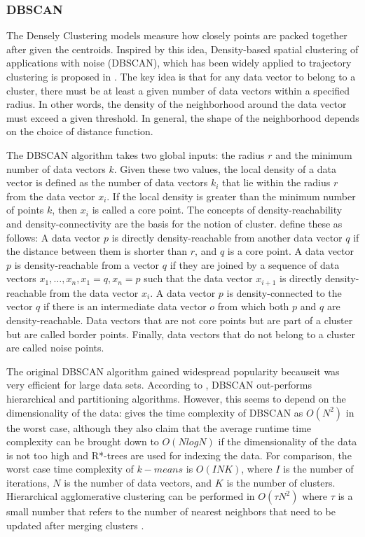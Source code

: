 \documentclass[a4paper, 12pt]{article}
\begin{document}
\subsubsection{DBSCAN}
The Densely Clustering models measure how closely points are packed together after given the centroids. Inspired by this idea, Density-based spatial clustering of applications with noise (DBSCAN), which has been widely applied to trajectory clustering is proposed in \citeyear{ester1996density}. The key idea is that for any data vector to belong to a cluster, there must be at least a given number of data vectors within a specified radius. In other words, the density of the neighborhood around the data vector must exceed a given threshold. In general, the shape of the neighborhood depends on the choice of distance function.

The DBSCAN algorithm \citep{ester1996density, kriegel2011density} takes two global inputs: the radius $r$ and the minimum number of data vectors $k$. Given these two values, the local density of a data vector is defined as the number of data vectors $k_{i}$ that lie within the radius $r$ from the data vector ${x_{i}}$. If the local density is greater than the minimum number of points $k$, then $x_{i}$ is called a core point. The concepts of density-reachability and density-connectivity are the basis for the notion of cluster. \cite{ester1996density} define these as follows: A data vector $p$ is directly density-reachable from another data vector $q$ if the distance between them is shorter than $r$, and $q$ is a core point. A data vector $p$ is density-reachable from a vector $q$ if they are joined by a sequence of data vectors $x_{1},\dots,x_{n}, x_{1}=q, x_{n}=p$ such that the data vector $x_{i+1}$ is directly density-reachable from the data vector $x_{i}$. A data vector $p$ is density-connected to the vector $q$ if there is an intermediate data vector $o$ from which both $p$ and $q$ are density-reachable. Data vectors that are not core points but are part of a cluster but are called border points. Finally, data vectors that do not belong to a cluster are called noise points.

The original DBSCAN algorithm gained widespread popularity becauseit was very efficient for large data sets. According to \cite{kotsiantis2004recent}, DBSCAN out-performs hierarchical and partitioning algorithms. However, this seems to depend on the dimensionality of the data: \cite{kriegel2011density} gives the time complexity of DBSCAN as $O(N^2)$ in the worst case, although they also claim that the average runtime time complexity can be brought down to $O(NlogN)$ if the dimensionality of the data is not too high and R*-trees are used for indexing the data. For comparison, the worst case time complexity of $k-means$ is $O(INK)$, where $I$ is the number of iterations, $N$ is the number of data vectors, and $K$ is the number of clusters. Hierarchical agglomerative clustering can be performed in $O(\tau N^2)$ where $\tau$ is a small number that refers to the number of nearest neighbors that need to be updated after merging clusters \citep{franti2006fast}.
\end{document}
